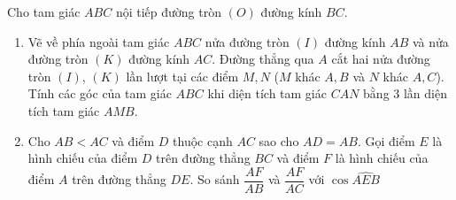 \begin{ex}%
    Cho tam giác $ABC$ nội tiếp đường tròn $(O)$ đường kính $BC$.
    \begin{enumerate}
    \item Vẽ về phía ngoài tam giác $ABC$ nửa đường tròn $(I)$ đường kính $AB$ và nửa đường tròn $(K)$ đường kính $AC$. Đường thẳng qua $A$ cắt hai nửa đường tròn $(I)$, $(K)$ lần lượt tại các điểm $M, N$ ($M$ khác $A, B$ và $N$ khác $A, C$).\\
	Tính các góc của tam giác $ABC$ khi diện tích tam giác $CAN$ bằng 3 lần diện tích tam giác $AMB$.
	\item Cho $AB < AC$ và điểm $D$ thuộc cạnh $AC$ sao cho $AD = AB$. Gọi điểm $E$ là hình chiếu của điểm $D$ trên đường thẳng $BC$ và điểm $F$ là hình chiếu của điểm $A$ trên đường thẳng $DE$.
	So sánh $\dfrac{AF}{AB}$ và $\dfrac{AF}{AC}$ với $\cos \widehat{AEB}$
    \end{enumerate}
\end{ex}
